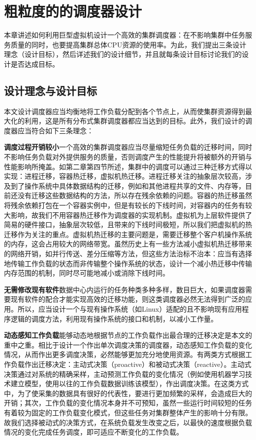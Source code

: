 
\chapter{粗粒度的的调度器设计}
\label{chap:LB}
本章讲述如何利用巨型虚拟机设计一个高效的集群调度器：在不影响集群中任务服务质量的同时，也要提高集群总体CPU资源的使用率。为此，我们提出三条设计理念（设计目标），然后详述我们的设计细节，并且就每条设计目标讨论我们的设计是否达成目标。
\section{设计理念与设计目标}
本文设计调度器应当均衡地将工作负载分配到各个节点上，从而使集群资源得到最大化的利用，这是所有分布式集群调度器都应当达到的目标。此外，我们设计的调度器应当符合如下三条理念：

\noindent\textbf{调度过程开销较小}\quad 一个高效的集群调度器应当尽量缩短任务负载的迁移时间，同时不影响任务负载对外提供服务的质量，否则调度产生的性能提升将被额外的开销与性能影响所掩盖。如第二章第四节所述，集群中的调度可以通过三种迁移方式得以实现：进程迁移，容器热迁移，虚拟机热迁移。进程迁移关注的抽象层次较高，涉及到了操作系统中具体数据结构的迁移，例如和其他进程共享的文件、内存等，目前还没有迁移这些数据结构的方法，所以存在残余依赖的问题。容器的热迁移虽然将残余依赖打包在一个容器实例中，但是有较长的下线时间，对容器内的任务有较大影响，故我们不用容器热迁移作为调度器的实现机制。虚拟机为上层软件提供了简易的硬件接口，抽象层次较低，且带来的下线时间极短，所以我们把虚拟机的热迁移作为关注的重点。虚拟机热迁移的主要问题是，需要迁移整个客户机操作系统的内存，这会占用较大的网络带宽。虽然历史上有一些方法减小虚拟机热迁移带来的网络开销，如并行传送\cite{parallelm}、差分压缩\cite{compression}等方法，但这些方法治标不治本：应当有选择地传输工作负载的状态而非传输整个操作系统的状态，设计一个减小热迁移中传输内存范围的机制，同时尽可能地减小或消除下线时间。

\noindent\textbf{无需修改现有软件}\quad 数据中心内运行的任务种类多种多样，数目巨大，如果调度器需要现有软件的配合才能实现高效的迁移功能，则这类调度器必然无法得到广泛的应用。所以，应当设计一个与现有操作系统（如Linux）适配的且不影响现有应用程序逻辑的调度方法，利用现有操作系统的接口和机制，以减小工作量。

\noindent\textbf{动态感知工作负载}\quad 能够动态地根据节点的工作负载作出最合理的迁移决定是本文的重中之重。相比于设计一个作出单次调度决策的调度器，动态感知工作负载的变化情况，从而作出更多调度决策，必然能够更加充分地使用资源。有两类方式根据工作负载作出迁移决定：主动式决策（proactive）和被动式决策（reactive）。主动式决策通过对系统的精确采样，主动预测工作负载的变化情况（例如使用机器学习技术建立模型，使用以往的工作负载数据训练该模型），作出调度决策。在这类方式中，为了使采集的数据具有很好的代表性，要进行更加频繁的采样，会造成巨大的开销；其次，工作负载的变化情况本身并不可预知，虽然一些运行时间较短的任务有着较为固定的工作负载变化模式，但这些任务对集群整体产生的影响十分有限。故我们选择被动式的决策方式，在系统负载发生改变之后，以最快的速度根据负载情况的变化完成任务调度，即可适应不断变化的工作负载。

